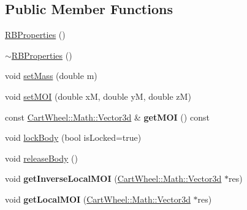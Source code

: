 \subsection*{Public Member Functions}
\begin{DoxyCompactItemize}
\item 
\hyperlink{classCartWheel_1_1Physics_1_1RBProperties_a53a77cc23fef32e8a87f84145f7276bf}{RBProperties} ()
\item 
\hyperlink{classCartWheel_1_1Physics_1_1RBProperties_a129bad7fd6a18c27957897cbafa05e11}{$\sim$RBProperties} ()
\item 
void \hyperlink{classCartWheel_1_1Physics_1_1RBProperties_accb862bc36c91141bf5f61a48ce51474}{setMass} (double m)
\item 
void \hyperlink{classCartWheel_1_1Physics_1_1RBProperties_a81e85925571e28deb48e0339c0a98993}{setMOI} (double xM, double yM, double zM)
\item 
\hypertarget{classCartWheel_1_1Physics_1_1RBProperties_a8d63205c20fd1b8facefd4a10a1357fe}{
const \hyperlink{classCartWheel_1_1Math_1_1Vector3d}{CartWheel::Math::Vector3d} \& {\bfseries getMOI} () const }
\label{classCartWheel_1_1Physics_1_1RBProperties_a8d63205c20fd1b8facefd4a10a1357fe}

\item 
void \hyperlink{classCartWheel_1_1Physics_1_1RBProperties_a1687b2917454eff9bc2e98221eafb6b6}{lockBody} (bool isLocked=true)
\item 
void \hyperlink{classCartWheel_1_1Physics_1_1RBProperties_a7c7c7d8946a396d35e02f4ceb2474ef2}{releaseBody} ()
\item 
\hypertarget{classCartWheel_1_1Physics_1_1RBProperties_a0bc219f7837ede7a3db863a747d00223}{
void {\bfseries getInverseLocalMOI} (\hyperlink{classCartWheel_1_1Math_1_1Vector3d}{CartWheel::Math::Vector3d} $\ast$res)}
\label{classCartWheel_1_1Physics_1_1RBProperties_a0bc219f7837ede7a3db863a747d00223}

\item 
\hypertarget{classCartWheel_1_1Physics_1_1RBProperties_a0f5abf89b1a41b974e4664c39f365208}{
void {\bfseries getLocalMOI} (\hyperlink{classCartWheel_1_1Math_1_1Vector3d}{CartWheel::Math::Vector3d} $\ast$res)}
\label{classCartWheel_1_1Physics_1_1RBProperties_a0f5abf89b1a41b974e4664c39f365208}

\end{DoxyCompactItemize}
